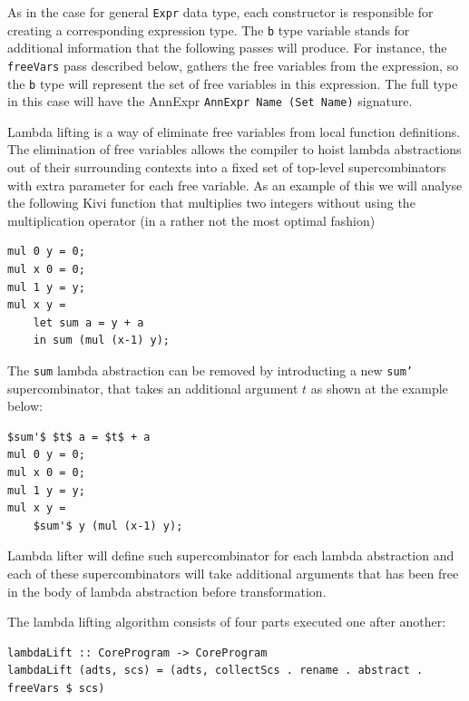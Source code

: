 \documentclass[12pt,a4paper]{report}
\begin{document}
As in the case for general \texttt{Expr} data type, each constructor is
responsible for creating a corresponding expression type. The \texttt{b} type
variable stands for additional information that the following passes will
produce. For instance, the \texttt{freeVars} pass described below, gathers the
free variables from the expression, so the \texttt{b} type will represent the
set of free variables in this expression. The full type in this case will have
the AnnExpr \texttt{AnnExpr Name (Set Name)} signature.

Lambda lifting is a way of eliminate free variables from local function
definitions. The elimination of free variables allows the compiler to hoist
lambda abstractions out of their surrounding contexts into a fixed set of
top-level supercombinators with extra parameter for each free variable. As an
example of this we will analyse the following Kivi function that multiplies two
integers without using the multiplication operator (in a rather not the most
optimal fashion)

\vspace*{0.2in}
\begin{lstlisting}[style=haskell]
mul 0 y = 0;
mul x 0 = 0;
mul 1 y = y;
mul x y =
    let sum a = y + a
    in sum (mul (x-1) y);
\end{lstlisting}

The \texttt{sum} lambda abstraction can be removed by introducting a new
\texttt{sum'} supercombinator, that takes an additional argument $t$ as shown at
the example below:

\vspace*{0.2in}
\begin{lstlisting}[style=haskell,mathescape=true]
$sum'$ $t$ a = $t$ + a
mul 0 y = 0;
mul x 0 = 0;
mul 1 y = y;
mul x y =
    $sum'$ y (mul (x-1) y);
\end{lstlisting}

Lambda lifter will define such supercombinator for each lambda abstraction and
each of these supercombinators will take additional arguments that has been
free in the body of lambda abstraction before transformation.

The lambda lifting algorithm consists of four parts executed one after another:

\vspace*{0.2in}
\begin{lstlisting}[style=haskell]
lambdaLift :: CoreProgram -> CoreProgram
lambdaLift (adts, scs) = (adts, collectScs . rename . abstract . freeVars $ scs)
\end{lstlisting}
\end{document}
